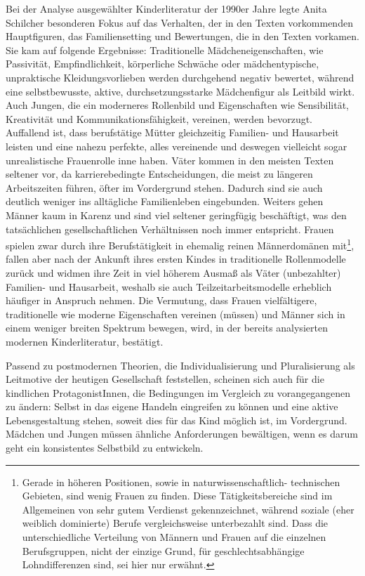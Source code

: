    Bei der Analyse ausgewählter Kinderliteratur der 1990er Jahre legte Anita
    Schilcher besonderen Fokus auf das Verhalten, der in den Texten vorkommenden
    Hauptfiguren, das Familiensetting und Bewertungen, die in den Texten
    vorkamen. Sie kam auf folgende Ergebnisse: Traditionelle
    Mädcheneigenschaften, wie Passivität, Empfindlichkeit, körperliche Schwäche
    oder mädchentypische, unpraktische Kleidungsvorlieben werden durchgehend
    negativ bewertet, während eine selbstbewusste, aktive, durchsetzungsstarke
    Mädchenfigur als Leitbild wirkt. Auch Jungen, die ein moderneres Rollenbild
    und Eigenschaften wie Sensibilität, Kreativität und Kommunikationsfähigkeit,
    vereinen, werden bevorzugt. Auffallend ist, dass berufstätige Mütter
    gleichzeitig Familien- und Hausarbeit leisten und eine nahezu perfekte,
    alles vereinende und deswegen vielleicht sogar unrealistische Frauenrolle
    inne haben. Väter kommen in den meisten Texten seltener vor, da
    karrierebedingte Entscheidungen, die meist zu längeren Arbeitszeiten führen,
    öfter im Vordergrund stehen. Dadurch sind sie auch deutlich weniger ins
    alltägliche Familienleben eingebunden. Weiters gehen Männer kaum in Karenz
    und sind viel seltener geringfügig beschäftigt, was den tatsächlichen
    gesellschaftlichen Verhältnissen noch immer entspricht. Frauen spielen zwar
    durch ihre Berufstätigkeit in ehemalig reinen Männerdomänen
    mit\footnote{Gerade in höheren Positionen, sowie in naturwissenschaftlich-
    technischen Gebieten, sind wenig Frauen zu finden. Diese Tätigkeitsbereiche
    sind im Allgemeinen von sehr gutem Verdienst gekennzeichnet, während soziale
    (eher weiblich dominierte) Berufe vergleichsweise unterbezahlt sind. Dass
    die unterschiedliche Verteilung von Männern und Frauen auf die einzelnen
    Berufsgruppen, nicht der einzige Grund, für geschlechtsabhängige
    Lohndifferenzen sind, sei hier nur erwähnt.}, fallen aber nach der Ankunft
    ihres ersten Kindes in traditionelle Rollenmodelle zurück und widmen ihre
    Zeit in viel höherem Ausmaß als Väter (unbezahlter) Familien- und
    Hausarbeit, weshalb sie auch Teilzeitarbeitsmodelle  erheblich häufiger in
    Anspruch nehmen. Die Vermutung, dass Frauen vielfältigere, traditionelle wie
    moderne Eigenschaften vereinen (müssen) und Männer sich in einem weniger
    breiten Spektrum bewegen, wird, in der bereits analysierten modernen
    Kinderliteratur, bestätigt.

    Passend zu postmodernen Theorien, die Individualisierung und Pluralisierung
    als Leitmotive der heutigen Gesellschaft feststellen, scheinen sich auch für
    die kindlichen ProtagonistInnen, die Bedingungen im Vergleich zu
    vorangegangenen zu ändern: Selbst in das eigene Handeln eingreifen zu können
    und eine aktive Lebensgestaltung stehen, soweit dies für das Kind möglich
    ist, im Vordergrund. Mädchen und Jungen müssen ähnliche Anforderungen
    bewältigen, wenn es darum geht ein konsistentes Selbstbild zu entwickeln.

